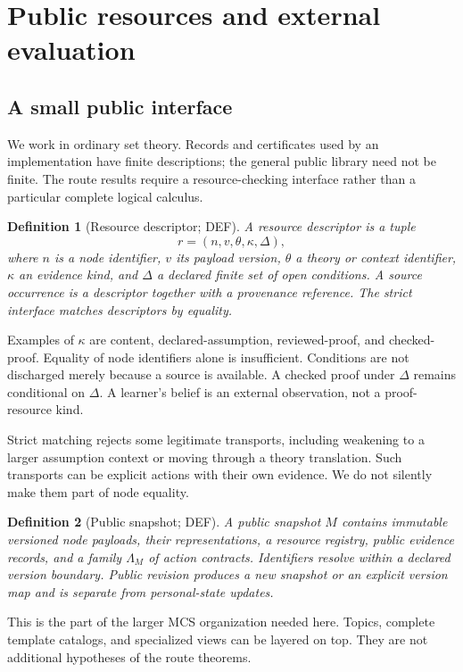 \documentclass[11pt,a4paper]{article}
\newtheorem{definition}{Definition}[section]
\theoremstyle{remark}
\newcommand{\status}[1]{\textsf{\small #1}}
\begin{document}
\section{Public resources and external evaluation}\label{sec:interface}
\subsection{A small public interface}
We work in ordinary set theory. Records and certificates used by an
implementation have finite descriptions; the general public library need not
be finite. The route results require a resource-checking interface rather than
a particular complete logical calculus.

\begin{definition}[Resource descriptor; \status{DEF}]\label{def:resource}
A resource descriptor is a tuple
\[
 r=(n,v,\theta,\kappa,\Delta),
\]
where \(n\) is a node identifier, \(v\) its payload version, \(\theta\) a theory
or context identifier, \(\kappa\) an evidence kind, and \(\Delta\) a declared
finite set of open conditions. A source occurrence is a descriptor together
with a provenance reference. The strict interface matches descriptors by equality.
\end{definition}
Examples of \(\kappa\) are content, declared-assumption, reviewed-proof, and
checked-proof. Equality of node identifiers alone is insufficient.
Conditions are not discharged merely because a source is available.
A checked proof under \(\Delta\) remains conditional on \(\Delta\). A learner's
belief is an external observation, not a proof-resource kind.

Strict matching rejects some legitimate transports, including weakening to a
larger assumption context or moving through a theory translation. Such
transports can be explicit actions with their own evidence.
We do not silently make them part of node equality.

\begin{definition}[Public snapshot; \status{DEF}]
A public snapshot \(M\) contains immutable versioned node payloads, their
representations, a resource registry, public evidence records, and a family
\(\Lambda_M\) of action contracts. Identifiers resolve within a declared
version boundary. Public revision produces a new snapshot or an explicit
version map and is separate from personal-state updates.
\end{definition}
This is the part of the larger MCS organization needed here. Topics,
complete template catalogs, and specialized views can be layered on top.
They are not additional hypotheses of the route theorems.
\end{document}
